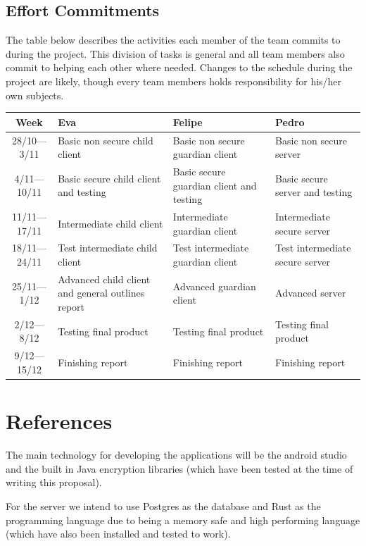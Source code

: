 \documentclass[a4paper]{article}
\begin{document}
\subsection{Effort Commitments}
The table below describes the activities each member of the team commits to during the project. This
division of tasks is general and all team members also commit to helping each other where needed.
Changes to the schedule during the project are likely, though every team members holds
responsibility for his/her own subjects.
\begin{center}
\begin{tabular}{c m{3.7cm} m{3.7cm} m{3.7cm}}
    \toprule
    Week & Eva & Felipe & Pedro\\ \toprule
    28/10---3/11 & Basic non secure child client & Basic non secure guardian client & Basic non secure server \\\midrule
    4/11---10/11 & Basic secure child client and testing & Basic secure guardian client and testing & Basic secure server and testing\\\midrule
    11/11---17/11 & Intermediate child client & Intermediate guardian client & Intermediate secure server\\\midrule
    18/11---24/11 & Test intermediate child client & Test intermediate guardian client & Test intermediate secure server\\\midrule
    25/11---1/12 & Advanced child client and general outlines report & Advanced guardian client & Advanced server\\\midrule
    2/12---8/12 & Testing final product & Testing final product & Testing final product\\\midrule
    9/12---15/12 & Finishing report & Finishing report & Finishing report\\\bottomrule
\end{tabular}
\end{center}

\section{References}
The main technology for developing the applications will be the android studio and the built in Java
encryption libraries (which have been tested at the time of writing this proposal).

For the server we intend to use Postgres as the database and Rust as the programming language due to
being a memory safe and high performing language (which have also been installed and tested to work).
\end{document}

